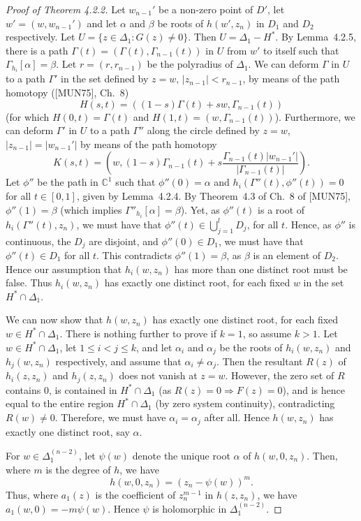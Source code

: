 \documentclass[11pt]{article}
\theoremstyle{plain}
\theoremstyle{definition}
\newcommand{\C}{\mathbb{C}}
\begin{document}
\begin{proof}[Proof of Theorem 4.2.2]
Let $w_{n-1}'$ be a non-zero point of $D'$, let $w' = (w, w_{n-1}')$
and let $\alpha$ and $\beta$ be roots of $h(w', z_n)$ in $D_1$ and
$D_2$ respectively. Let $U = \{ z \in \Delta_1 : G(z) \ne 0 \}$.
Then $U = \Delta_1 - H^*$. By Lemma~4.2.5, there is a path
$\Gamma(t) = (\Gamma(t), \Gamma_{n-1}(t))$ in $U$ from $w'$ to
itself such that $\Gamma_{h_i}[\alpha] = \beta$. Let
$r = (r, r_{n-1})$ be the polyradius of $\Delta_1$. We can deform
$\Gamma$ in $U$ to a path $\Gamma'$ in the set defined by $z = w$,
$|z_{n-1}| < r_{n-1}$, by means of the path homotopy ([MUN75], Ch.~8)
\[
H(s, t) = ((1 - s) \Gamma(t) + s w, \Gamma_{n-1}(t))
\]
(for which $H(0, t) = \Gamma(t)$ and $H(1, t) = (w, \Gamma_{n-1}(t))$).
Furthermore, we can deform $\Gamma'$ in $U$ to a path $\Gamma''$
along the circle defined by $z = w$, $|z_{n-1}| = |w_{n-1}'|$ by
means of the path homotopy
\[
K(s, t) = \left( w, (1 - s) \Gamma_{n-1}(t)
+ s \frac{\Gamma_{n-1}(t) |w_{n-1}'|}{|\Gamma_{n-1}(t)|} \right).
\]
Let $\phi''$ be the path in $\C^1$ such that $\phi''(0) = \alpha$ and
$h_i(\Gamma''(t), \phi''(t)) = 0$ for all $t \in [0, 1]$, given by
Lemma~4.2.4. By Theorem~4.3 of Ch.~8 of [MUN75], $\phi''(1) = \beta$
(which implies $\Gamma''_{h_i}[\alpha] = \beta$). Yet, as $\phi''(t)$
is a root of $h_i(\Gamma''(t), z_n)$, we must have that
$\phi''(t) \in \bigcup_{j=1}^{l} D_j$, for all $t$. Hence, as
$\phi''$ is continuous, the $D_j$ are disjoint, and
$\phi''(0) \in D_1$, we must have that $\phi''(t) \in D_1$ for all
$t$. This contradicts $\phi''(1) = \beta$, as $\beta$ is an element
of $D_2$. Hence our assumption that $h_i(w, z_n)$ has more than one
distinct root must be false. Thus $h_i(w, z_n)$ has exactly one
distinct root, for each fixed $w$ in the set $H^* \cap \Delta_1$.

We can now show that $h(w, z_n)$ has exactly one distinct root, for
each fixed $w \in H^* \cap \Delta_1$. There is nothing further to
prove if $k = 1$, so assume $k > 1$. Let
$w \in H^* \cap \Delta_1$, let $1 \le i < j \le k$, and let
$\alpha_i$ and $\alpha_j$ be the roots of $h_i(w, z_n)$ and
$h_j(w, z_n)$ respectively, and assume that $\alpha_i \ne \alpha_j$.
Then the resultant $R(z)$ of $h_i(z, z_n)$ and $h_j(z, z_n)$ does
not vanish at $z = w$. However, the zero set of $R$ contains $0$, is
contained in $H^* \cap \Delta_1$ (as $R(z) = 0 \Rightarrow F(z) = 0$),
and is hence equal to the entire region $H^* \cap \Delta_1$ (by
zero system continuity), contradicting $R(w) \ne 0$. Therefore, we
must have $\alpha_i = \alpha_j$ after all. Hence $h(w, z_n)$ has
exactly one distinct root, say $\alpha$.

For $w \in \Delta_1^{(n-2)}$, let $\psi(w)$ denote the unique root
$\alpha$ of $h(w, 0, z_n)$. Then, where $m$ is the degree of $h$, we
have
\[
h(w, 0, z_n) = (z_n - \psi(w))^m.
\]
Thus, where $a_1(z)$ is the coefficient of $z_n^{m-1}$ in
$h(z, z_n)$, we have $a_1(w, 0) = -m \psi(w)$. Hence $\psi$ is
holomorphic in $\Delta_1^{(n-2)}$.
\end{proof}
\end{document}
